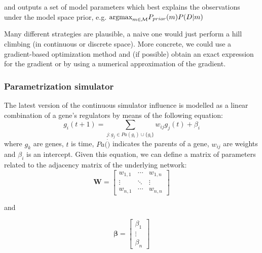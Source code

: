 \documentclass{article}
\begin{document}
and outputs a set of model parameters which best explains the observations under the model space prior, e.g.
$\hbox{argmax}_{m\in\mathcal{M}} P_{prior}(m)P(D|m)$

Many different strategies are plausible, a naive one would just perform a hill climbing (in continuous or discrete space). More concrete, we could use a gradient-based optimization method and (if possible)
obtain an exact expression for the gradient or by using a numerical approximation of the gradient.
\subsubsection{Parametrization simulator}\label{sec:param_sim}
The latest version of the continuous simulator influence is modelled as a linear combination of a gene's regulators by means of the following equation:
\begin{equation}
 g_i(t+1) = \sum_{j : g_j \in Pa(g_i) \cup \{g_i\} } w_{ij}g_j(t) + \beta_{i}
 \label{eq:cont_sim}
\end{equation}
where $g_k$ are genes, $t$ is time, $Pa(\dot)$ indicates the parents of a gene, $w_{ij}$ are weights and $\beta_i$ is an intercept. 
Given this equation, we can define a matrix of parameters related to the adjacency matrix of the underlying network:
\begin{equation}
\mathbf{W} = \begin{bmatrix} 
w_{1,1} &\cdots & w_{1,n}\\
\vdots & \ddots & \vdots \\
w_{n,1} & \cdots & w_{n,n} 
      \end{bmatrix}
\end{equation}


and

\begin{equation}
 \mathbf{\beta} = \begin{bmatrix}
      \beta_1 \\
      \vdots \\
      \beta_n 
     \end{bmatrix}
\end{equation}
\end{document}
